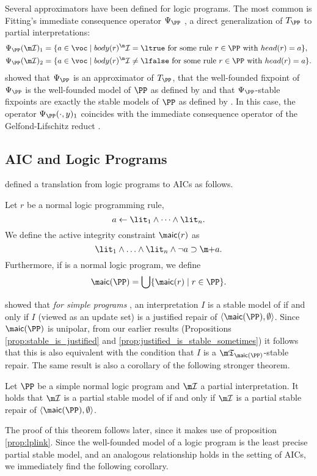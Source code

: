 Several approximators have been defined for logic programs. The most common is Fitting's immediate consequence operator $\Psi_\PP$ \cite{tcs/Fitting02}, a direct
generalization of $T_\PP$ to partial interpretations:
  \begin{align*}
    \Psi_\PP(\pstruct)_1 &=\{a\in \voc\mid body(r)^\pstruct=\ltrue \text{ for some rule $r\in \PP$ with }head(r)=a\},\\
    \Psi_\PP(\pstruct)_2 &=\{a\in \voc\mid body(r)^\pstruct\neq \lfalse \text{ for some rule $r\in \PP$ with }head(r)=a\}.
   \end{align*}
\citet{DeneckerMT00} showed that $\Psi_\PP$ is an approximator of $T_\PP$, that  the well-founded fixpoint of $\Psi_\PP$ is the well-founded model of $\PP$ as defined by \citeauthor{GelderRS91} and that $\Psi_\PP$-stable fixpoints are exactly the stable models of $\PP$ as defined by \citeauthor{iclp/GelfondL88}. In this case, 
the operator $\Psi_\PP(\cdot,y)_1$ coincides with the immediate consequence operator of the Gelfond-Lifschitz reduct \cite{iclp/GelfondL88}. 




\subsection{AIC and Logic Programs}
\citet{tplp/CaropreseT11} defined a translation from logic programs to AICs as follows. 
\begin{definition}
 Let $r$ be a normal logic programming rule, 
 \[a\leftarrow \lit_1  \land \dots \land \lit_n.\]
 We define the active integrity constraint $\aicop (r)$ as 
 \[\lit_1\wedge\ldots\wedge\lit_n\wedge\neg a \aicrule \add a.\]
 Furthermore, if \PP is a normal logic program, we define 
 \[\aicop(\PP)=\bigcup\{\aicop(r)\mid r\in \PP\}.\]
\end{definition}

\citet{tplp/CaropreseT11} showed that \emph{for simple programs \PP}, an interpretation $I$ is a stable model of \PP if and only if $I$ (viewed as an update set) is a justified repair of $\langle\aicop(\PP),\emptyset\rangle$. Since $\aicop(\PP)$ is unipolar, from our earlier results (Propositions \ref{prop:stable_is_justified} and \ref{prop:justified_is_stable_sometimes}) it follows that this is also equivalent with the condition that $I$ is a $\threeap_{\aicop(\PP)}$-stable repair. 
The same result is also a corollary of the following stronger theorem. 
\begin{theorem}\label{thm:partialstable-LP}
 Let $\PP$ be a simple normal logic program and $\pstruct$ a partial interpretation. It holds that $\pstruct$ is a partial stable model of \PP if and only if $\pstruct$ is a partial stable repair of $\langle \aicop(\PP),\emptyset\rangle$. 
\end{theorem}
The proof of this theorem follows later, since it makes use of proposition \ref{prop:lplink}. 
Since the well-founded model of a logic program is the least precise partial stable model, and an analogous relationship holds in the setting of AICs, we immediately find the following corollary. 

